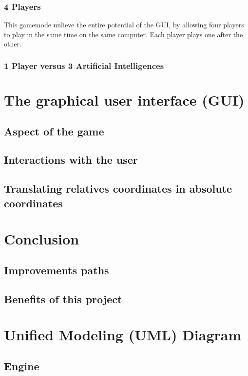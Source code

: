 \documentclass[english, 11pt, titlepage]{article}
\begin{document}
    \subsubsection{4 Players}
    This gamemode unlieve the entire potential of the GUI, by allowing four players to play in the same time on the same computer. Each player plays one after the other.

    \subsubsection{1 Player versus 3 Artificial Intelligences}

    \section{The graphical user interface (GUI)}
    \subsection{Aspect of the game}
    \subsection{Interactions with the user}
    \subsection{Translating relatives coordinates in absolute coordinates}

    \section{Conclusion}
    \subsection{Improvements paths}
    \subsection{Benefits of this project}
    \label{section:translating_coordinates}

    \pagebreak
    \appendix
    \appendixpage
    \addappheadtotoc
    \section{Unified Modeling (UML) Diagram}
    \subsection{Engine}
    
\end{document}
